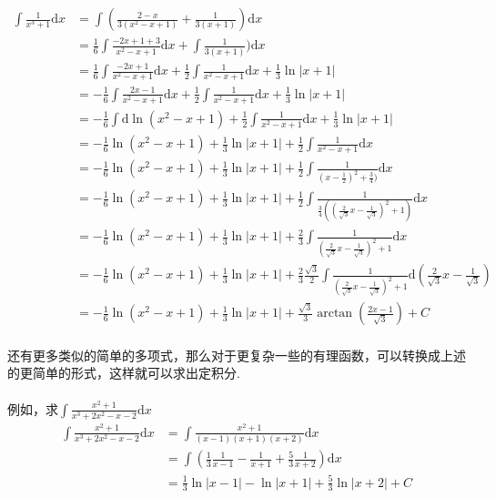 \begin{align*}
\int \frac{1}{x^3 + 1} \mathrm{d} x  & = \int (\frac{2 - x}{3(x^2 -x + 1)} +\frac{1}{3(x + 1)} ) \mathrm{d} x   \\
& = \frac{1}{6} \int \frac{-2x + 1 + 3}{x^2 - x + 1} \mathrm{d} x  + \int \frac{1}{3(x + 1)} ) \mathrm{d} x  \\
& = \frac{1}{6} \int \frac{-2x + 1}{x^2 - x + 1} \mathrm{d} x + \frac{1}{2} \int  \frac{1}{x^2 - x + 1} \mathrm{d} x + \frac{1}{3} \ln{|x + 1|} \\
& = -\frac{1}{6} \int  \frac{2x - 1}{x^2 - x + 1} \mathrm{d} x + \frac{1}{2} \int  \frac{1}{x^2 - x + 1} \mathrm{d} x + \frac{1}{3} \ln{|x + 1|} \\
& = -\frac{1}{6} \int \mathrm{d} \ln{(x^2 -x + 1)} +  \frac{1}{2}  \int  \frac{1}{x^2 - x + 1} \mathrm{d} x + \frac{1}{3} \ln{|x + 1|} \\
& = -\frac{1}{6} \ln{(x^2 -x + 1)} +   \frac{1}{3} \ln{|x + 1|} + \frac{1}{2}  \int  \frac{1}{x^2 - x + 1} \mathrm{d} x  \\
& = -\frac{1}{6} \ln{(x^2 -x + 1)} +   \frac{1}{3} \ln{|x + 1|} + \frac{1}{2} \int \frac{1}{(x - \frac{1}{2})^2 + \frac{3}{4})} \mathrm{d} x  \\
& =  -\frac{1}{6} \ln{(x^2 -x + 1)} +   \frac{1}{3} \ln{|x + 1|} +  \frac{1}{2} \int \frac{1}{\frac{3}{4} ( (\frac{2}{\sqrt{3}} x - \frac{1}{\sqrt{3}})^2 + 1)} \mathrm{d} x  \\
& =  -\frac{1}{6} \ln{(x^2 -x + 1)} +   \frac{1}{3} \ln{|x + 1|} +\frac{2}{3} \int  \frac{1}{ (\frac{2}{\sqrt{3}} x - \frac{1}{\sqrt{3}})^2 + 1} \mathrm{d} x  \\
& =  -\frac{1}{6} \ln{(x^2 -x + 1)} +   \frac{1}{3} \ln{|x + 1|} +\frac{2}{3} \frac{\sqrt{3}}{2} \int \frac{1}{ (\frac{2}{\sqrt{3}} x - \frac{1}{\sqrt{3}})^2 + 1} \mathrm{d} (\frac{2}{\sqrt{3}} x - \frac{1}{\sqrt{3}} ) \\
& =  -\frac{1}{6} \ln{(x^2 -x + 1)} +   \frac{1}{3} \ln{|x + 1|} + \frac{\sqrt{3}}{3} \arctan{(\frac{2x - 1}{\sqrt{3}})}  + C
\end{align*}

\paragraph{}
还有更多类似的简单的多项式，那么对于更复杂一些的有理函数，可以转换成上述的更简单的形式，这样就可以求出定积分.

\paragraph{}
例如，求$\int \frac{x^2 + 1}{x^3 + 2x^2 -x - 2} \mathrm{d} x$
\begin{align*}
\int \frac{x^2 + 1}{x^3 + 2x^2 -x - 2} \mathrm{d} x & =  \int \frac{x^2 + 1}{(x-1)(x+1)(x+2)} \mathrm{d} x \\
& =   \int (\frac{1}{3} \frac{1}{x-1} - \frac{1}{x+1} + \frac{5}{3} \frac{1}{x+2} ) \mathrm{d} x \\
& = \frac{1}{3} \ln{|x-1|} - \ln{|x+1|} + \frac{5}{3} \ln{|x+2|} + C
\end{align*}






